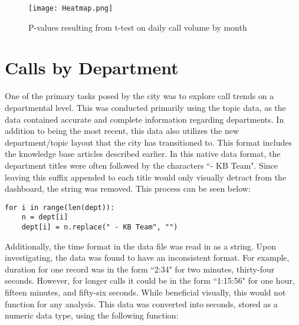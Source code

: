 \documentclass[11pt,twocolumn]{article}
\begin{document}
\begin{figure}[h]
	\texttt{[image: Heatmap.png]}
	\caption{P-values resulting from t-test on daily call volume by month}
\end{figure}


\section{Calls by Department}
One of the primary tasks posed by the city was to explore call trends on a departmental level.  This was conducted primarily using the topic data, as the data contained accurate and complete information regarding departments.  In addition to being the most recent, this data also utilizes the new department/topic layout that the city has transitioned to.  This format includes the knowledge base articles described earlier.  In this native data format, the department titles were often followed by the characters ``- KB Team".  Since leaving this suffix appended to each title would only visually detract from the dashboard, the string was removed.  This process can be seen below:\\

  \begin{Verbatim}[fontsize=\small]
  for i in range(len(dept)):
    n = dept[i]
    dept[i] = n.replace(" - KB Team", "")
  \end{Verbatim}


Additionally, the time format in the data file was read in as a string.  Upon investigating, the data was found to have an inconsistent format.  For example, duration for one record was in the form ``2:34" for two minutes, thirty-four seconds.  However, for longer calls it could be in the form ``1:15:56" for one hour, fifteen minutes, and fifty-six seconds.  While beneficial visually, this would not function for any analysis.  This data was converted into seconds, stored as a numeric data type, using the following function:
\end{document}
